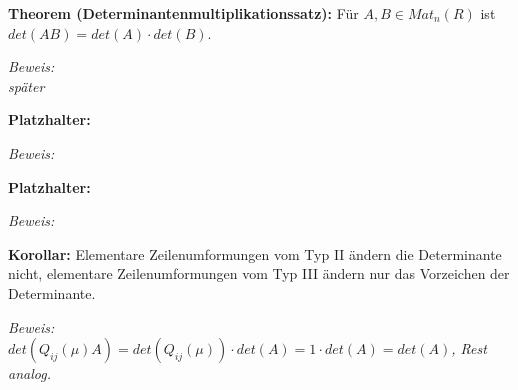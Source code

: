 \documentclass[11pt]{article}
\begin{document}
		\begin{mdframed}[backgroundcolor=blue!20]
			\textbf{Theorem (Determinantenmultiplikationssatz):} Für $A,B\in Mat_n(R)$ ist $det(AB)=det(A)\cdot det(B)$.
		\end{mdframed}
		\textit{Beweis: \\
		später}
		
		\begin{framed}
			\textbf{Platzhalter:} 
		\end{framed}
		\textit{Beweis: \\
		}
		
		\begin{framed}
			\textbf{Platzhalter:} 
		\end{framed}
		\textit{Beweis: \\
		}
		
		\begin{framed}
			\textbf{Korollar:} Elementare Zeilenumformungen vom Typ II ändern die Determinante nicht, elementare Zeilenumformungen vom 
			Typ III ändern nur das Vorzeichen der Determinante.
		\end{framed}
		\textit{Beweis: \\
		$det(Q_{ij}(\mu)A)=det(Q_{ij}(\mu)) \cdot det(A)= 1\cdot det(A) = det(A)$, Rest analog.}
\end{document}
